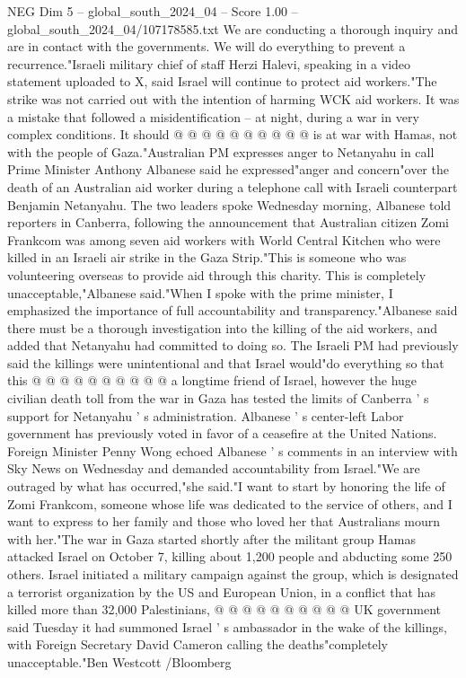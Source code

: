 \begin{textsample}{NEG Dim 5 – global\_south\_2024\_04 – Score 1.00 – global\_south\_2024\_04/107178585.txt}
We are conducting a thorough inquiry and are in contact with the governments.
We will do everything to prevent a recurrence."Israeli military chief of staff Herzi Halevi, speaking in a video statement uploaded to X, said Israel will continue to protect aid workers."The strike was not carried out with the intention of harming WCK aid workers.
It was a mistake that followed a misidentification -- at night, during a war in very complex conditions.
It should @ @ @ @ @ @ @ @ @ @ is at war with Hamas, not with the people of Gaza."Australian PM expresses anger to Netanyahu in call Prime Minister Anthony Albanese said he expressed"anger and concern"over the death of an Australian aid worker during a telephone call with Israeli counterpart Benjamin Netanyahu.
The two leaders spoke Wednesday morning, Albanese told reporters in Canberra, following the announcement that Australian citizen Zomi Frankcom was among seven aid workers with World Central Kitchen who were killed in an Israeli air strike in the Gaza Strip."This is someone who was volunteering overseas to provide aid through this charity.
This is completely unacceptable,"Albanese said."When I spoke with the prime minister, I emphasized the importance of full accountability and transparency."Albanese said there must be a thorough investigation into the killing of the aid workers, and added that Netanyahu had committed to doing so.
The Israeli PM had previously said the killings were unintentional and that Israel would"do everything so that this @ @ @ @ @ @ @ @ @ @ a longtime friend of Israel, however the huge civilian death toll from the war in Gaza has tested the limits of Canberra ' s support for Netanyahu ' s administration.
Albanese ' s center-left Labor government has previously voted in favor of a ceasefire at the United Nations.
Foreign Minister Penny Wong echoed Albanese ' s comments in an interview with Sky News on Wednesday and demanded accountability from Israel."We are outraged by what has occurred,"she said."I want to start by honoring the life of Zomi Frankcom, someone whose life was dedicated to the service of others, and I want to express to her family and those who loved her that Australians mourn with her."The war in Gaza started shortly after the militant group Hamas attacked Israel on October 7, killing about 1,200 people and abducting some 250 others.
Israel initiated a military campaign against the group, which is designated a terrorist organization by the US and European Union, in a conflict that has killed more than 32,000 Palestinians, @ @ @ @ @ @ @ @ @ @ UK government said Tuesday it had summoned Israel ' s ambassador in the wake of the killings, with Foreign Secretary David Cameron calling the deaths"completely unacceptable."Ben Westcott /Bloomberg

\end{textsample}
